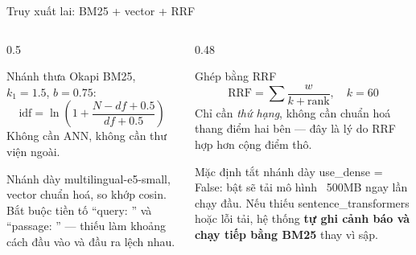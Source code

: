 \documentclass[aspectratio=169,11pt]{beamer}
\newcommand{\src}[1]{{\footnotesize\ttfamily #1}}
\begin{document}
\begin{frame}{Truy xuất lai: BM25 + vector + RRF}
  \begin{columns}[T]
    \begin{column}{0.5\textwidth}
      \begin{block}{\small Nhánh thưa}
        Okapi BM25, $k_1=1.5$, $b=0.75$:
        \[
          \mathrm{idf} = \ln\!\left(1+\frac{N-df+0.5}{df+0.5}\right)
        \]
        Không cần ANN, không cần thư viện ngoài.
      \end{block}
      \begin{block}{\small Nhánh dày}
        \src{multilingual-e5-small}, vector chuẩn hoá, so khớp cosin.
        Bắt buộc tiền tố \src{``query: ''} và \src{``passage: ''} — thiếu làm
        khoảng cách đầu vào và đầu ra lệch nhau.
      \end{block}
    \end{column}
    \begin{column}{0.48\textwidth}
      \begin{block}{\small Ghép bằng RRF}
        \[
          \mathrm{RRF} = \sum \frac{w}{k + \text{rank}},\quad k = 60
        \]
        Chỉ cần \emph{thứ hạng}, không cần chuẩn hoá thang điểm hai bên —
        đây là lý do RRF hợp hơn cộng điểm thô.
      \end{block}
      \begin{alertblock}{\small Mặc định tắt nhánh dày}
        \src{use\_dense = False}: bật sẽ tải mô hình ~500MB ngay lần chạy đầu.
        Nếu thiếu \src{sentence\_transformers} hoặc lỗi tải, hệ thống \textbf{tự
        ghi cảnh báo và chạy tiếp bằng BM25} thay vì sập.
      \end{alertblock}
    \end{column}
  \end{columns}
\end{frame}
\end{document}
